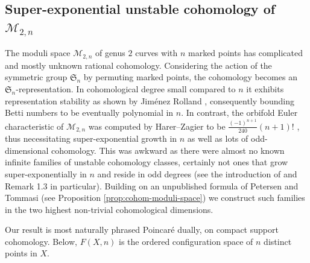 \documentclass[12pt]{article}
\newcommand{\SymGroup}[1][n]{\mathfrak{S}_{#1}}
\newcommand{\ModuliCurve}[1]{\mathcal{M}_{#1}}
\theoremstyle{plain}
\theoremstyle{definition}
\theoremstyle{remark}
\begin{document}
\subsection{Super-exponential unstable cohomology of \texorpdfstring{$\ModuliCurve{2,n}$}{M2,n}}
The moduli space $\ModuliCurve{2,n}$ of genus $2$ curves with $n$ marked points has complicated and mostly unknown rational cohomology. Considering the action of the symmetric group $\SymGroup$ by permuting marked points, the cohomology becomes an $\SymGroup$-representation.  In cohomological degree small compared to $n$ it exhibits representation stability as shown by Jiménez Rolland \cite{JR11}, consequently bounding Betti numbers to be eventually polynomial in $n$. In contrast, the orbifold Euler characteristic of $\ModuliCurve{2,n}$ was computed by Harer--Zagier to be $\frac{(-1)^{n+1}}{240}(n+1)!$
\cite[\S6]{HZ86}, thus necessitating super-exponential growth in $n$ as well as lots of odd-dimensional cohomology. This was awkward as there were almost no known infinite families of unstable cohomology classes, certainly not ones that grow super-exponentially in $n$ and reside in odd degrees (see the introduction of \cite{BBP} and Remark 1.3 in particular). Building on an unpublished formula of Petersen and Tommasi \cite{petersen-tommasi} (see Proposition \ref{prop:cohom-moduli-space}) we construct such families in the two highest non-trivial cohomological dimensions.

Our result is most naturally phrased Poincar\'{e} dually, on compact support cohomology. Below, $F(X,n)$ is the ordered configuration space of $n$ distinct points in $X$.
\end{document}
